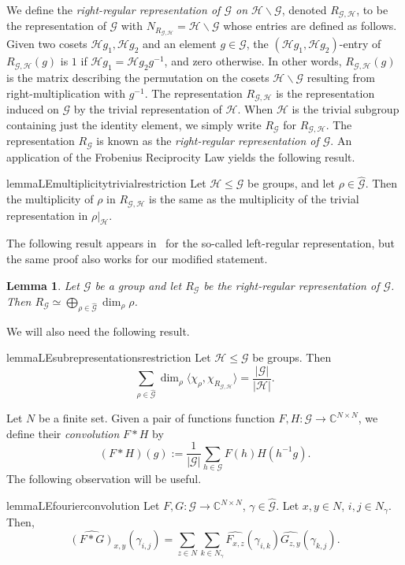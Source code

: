 \documentclass[a4paper,11pt]{article}
\newtheorem{lemma}[theorem]{Lemma}
\theoremstyle{definition}
\newcommand{\cc}{\mathbb{C}}
\newcommand{\gr}{\mathscr{G}}
\newcommand{\sgr}{\mathscr{H}}
\begin{document}
We define the \emph{right-regular representation of $\gr$ on $\sgr \backslash \gr$},  denoted $R_{\gr,\sgr}$, 
to be the representation of $\gr$ with
$N_{R_{\gr,\sgr}}=\sgr \backslash \gr$ whose entries are defined as follows. Given two cosets $\sgr g_1, \sgr g_2$ and an element $g\in \gr$, the $(\sgr g_1, \sgr g_2)$-entry of $R_{\gr,\sgr}(g)$ is $1$ if $\sgr g_1 = \sgr g_2 g^{-1}$, and zero otherwise. In other words, $R_{\gr,\sgr}(g)$ is the matrix describing the permutation on the cosets $\sgr \backslash \gr$ resulting from right-multiplication with $g^{-1}$. The representation $R_{\gr,\sgr}$ is the representation induced on $\gr$ by the trivial representation of $\sgr$. When $\sgr$ is the trivial subgroup containing just the identity element, we simply write $R_\gr$ for $R_{\gr,\sgr}$. The representation $R_\gr$ is known as the \emph{right-regular representation of $\gr$}.
An application of the Frobenius Reciprocity Law yields the following result. 

\begin{restatable}{lemma}{LEmultiplicitytrivialrestriction}
\label{le:multiplicity_trivial_restriction}
    Let $\sgr\leq \gr$ be groups, and let $\rho\in \widehat{\gr}$. Then the multiplicity of $\rho$ in $R_{\gr,\sgr}$ is the same as the multiplicity of the trivial representation in $\rho\vert_\sgr$.
\end{restatable}

The following result appears in~\cite[Lemma 2]{Terras_1999} for the so-called left-regular representation, 
but the same proof also works for our modified statement. 

\begin{lemma}
\label{le:dimension}
    Let $\gr$ be a group and let $R_\gr$ be the right-regular representation of $\gr$. Then $R_{\gr} \simeq \bigoplus_{\rho\in \widehat{\gr}} \dim_\rho \rho$.
\end{lemma}

We will also need the following result.

\begin{restatable}{lemma}{LEsubrepresentationsrestriction}
\label{le:subrepresentations_restriction}
Let $\sgr\leq \gr$ be groups. Then
\[
\sum_{\rho\in \widehat{\gr}}
\dim_\rho \langle \chi_\rho, \chi_{R_{\gr,\sgr}} \rangle = 
\frac{|\gr|}{|\sgr|}.
\]
\end{restatable}

Let $N$ be a finite set. Given a pair of functions function $F,H: \gr \to \mathbb{C}^{N \times N}$, we define their \emph{convolution} $F * H$ by 
\[(F * H)(g) := \frac{1}{|\gr|} \sum_{h \in \gr} F(h) H(h^{-1} g).\]
The following observation will be useful.
\begin{restatable}{lemma}{LEfourierconvolution}
\label{lem:fourier_convolution}
    Let  $F,G: \gr \to \cc^{N\times N}$, $\gamma \in \widehat{\gr}$. Let
    $x,y\in N$,
    $i,j\in N_\gamma$. Then, \[\widehat{(F * G)}_{x,y}(\gamma_{i,j}) =
    \sum_{z\in N} \sum_{k\in N_\gamma}
    \widehat{F_{x,z}}(\gamma_{i,k})\widehat{G_{z,y}}(\gamma_{k,j}).\]
\end{restatable}
\end{document}
